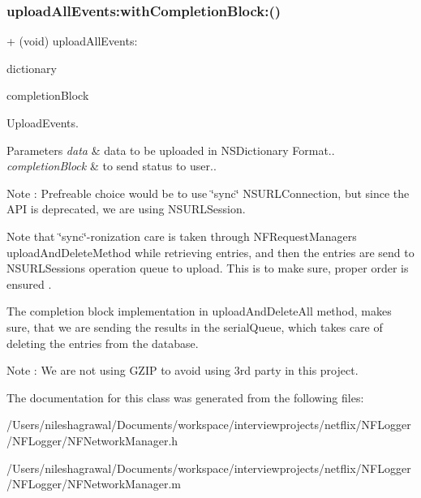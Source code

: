 \subsubsection{\texorpdfstring{upload\+All\+Events\+:with\+Completion\+Block\+:()}{uploadAllEvents:withCompletionBlock:()}}
{\footnotesize\ttfamily + (void) upload\+All\+Events\+: \begin{DoxyParamCaption}\item[{(N\+S\+Dictionary $\ast$)}]{dictionary }\item[{withCompletionBlock:(Upload\+Completion\+Block)}]{completion\+Block }\end{DoxyParamCaption}}



Upload\+Events. 


\begin{DoxyParams}{Parameters}
{\em data} & data to be uploaded in N\+S\+Dictionary Format.. \\
\hline
{\em completion\+Block} & to send status to user..\\
\hline
\end{DoxyParams}
Note \+: Prefreable choice would be to use \char`\"{}sync\char`\"{} N\+S\+U\+R\+L\+Connection, but since the A\+PI is deprecated, we are using N\+S\+U\+R\+L\+Session.

Note that \char`\"{}sync\char`\"{}-\/ronization care is taken through N\+F\+Request\+Manager\textquotesingle{}s upload\+And\+Delete\+Method while retrieving entries, and then the entries are send to N\+S\+U\+R\+L\+Session\textquotesingle{}s operation queue to upload. This is to make sure, proper order is ensured .

The completion block implementation in upload\+And\+Delete\+All method, makes sure, that we are sending the results in the serial\+Queue, which takes care of deleting the entries from the database.

Note \+: We are not using G\+Z\+IP to avoid using 3rd party in this project. 

The documentation for this class was generated from the following files\+:\begin{DoxyCompactItemize}
\item 
/\+Users/nileshagrawal/\+Documents/workspace/interviewprojects/netflix/\+N\+F\+Logger/\+N\+F\+Logger/N\+F\+Network\+Manager.\+h\item 
/\+Users/nileshagrawal/\+Documents/workspace/interviewprojects/netflix/\+N\+F\+Logger/\+N\+F\+Logger/N\+F\+Network\+Manager.\+m\end{DoxyCompactItemize}
